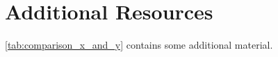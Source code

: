 \chapter{Additional Resources}
\label{sec:additional-resources}

\ref{tab:comparison_x_and_y} contains some additional material.

